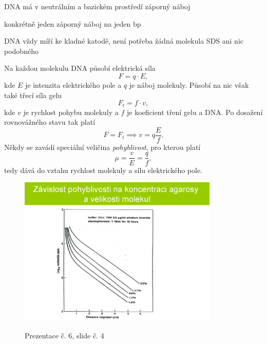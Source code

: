 \documentclass[DIV=8]{scrreprt}
\begin{document}
\begin{myItemize}[nosep]
    \item DNA má v neutrálním a bazickém prostředí záporný náboj
\begin{myItemize}[nosep]
    \item konkrétně jeden záporný náboj na jeden bp
\end{myItemize}

    \item DNA vždy míří ke kladné katodě, není potřeba žádná molekula SDS ani nic podobného
\end{myItemize}



Na každou molekulu DNA působí elektrická síla
\[F = q \cdot E,\]
kde \(E\) je intenzita elektrického pole a \(q\) je náboj molekuly. Působí na nic však také třecí síla gelu
\[F_t = f \cdot v,\]
kde \(v\) je rychlost pohybu molekuly a \(f\) je koeficient tření gelu a DNA. Po dosažení rovnovážného stavu tak platí
\[F = F_t \implies v = q \frac{E}{f}.\]
Někdy se zavádí speciální veličina \emph{pohyblivost}, pro kterou platí
\[\mu = \frac{v}{E} = \frac{q}{f},\]
tedy dává do vztahu rychlost molekuly a sílu elektrického pole.

\begin{figure}
    \caption{Prezentace č. 6, slide č. 4}
    \includegraphics[width=0.85\textwidth]{slides-6/slide-4.jpg}
    \centering
    \label{slides-6-slide-4}
\end{figure}
\end{document}
